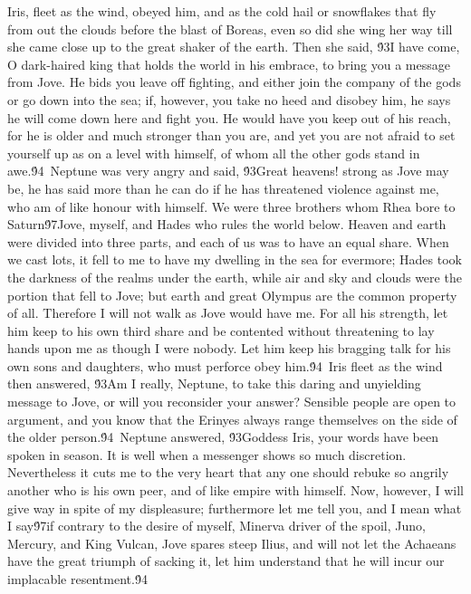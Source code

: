 {Iris, fleet as the wind, obeyed him, and as the cold hail or snowflakes that fly from out the clouds before the blast of Boreas, even so did she wing her way till she came close up to the great shaker of the earth. Then she said, \'93I have come, O dark-haired king that holds the world in his embrace, to bring you a message from Jove. He bids you leave off fighting, and either join the company of the gods or go down into the sea; if, however, you take no heed and disobey him, he says he will come down here and fight you. He would have you keep out of his reach, for he is older and much stronger than you are, and yet you are not afraid to set yourself up as on a level with himself, of whom all the other gods stand in awe.\'94\
Neptune was very angry and said, \'93Great heavens! strong as Jove may be, he has said more than he can do if he has threatened violence against me, who am of like honour with himself. We were three brothers whom Rhea bore to Saturn\'97Jove, myself, and Hades who rules the world below. Heaven and earth were divided into three parts, and each of us was to have an equal share. When we cast lots, it fell to me to have my dwelling in the sea for evermore; Hades took the darkness of the realms under the earth, while air and sky and clouds were the portion that fell to Jove; but earth and great Olympus are the common property of all. Therefore I will not walk as Jove would have me. For all his strength, let him keep to his own third share and be contented without threatening to lay hands upon me as though I were nobody. Let him keep his bragging talk for his own sons and daughters, who must perforce obey him.\'94\
Iris fleet as the wind then answered, \'93Am I really, Neptune, to take this daring and unyielding message to Jove, or will you reconsider your answer? Sensible people are open to argument, and you know that the Erinyes always range themselves on the side of the older person.\'94\
Neptune answered, \'93Goddess Iris, your words have been spoken in season. It is well when a messenger shows so much discretion. Nevertheless it cuts me to the very heart that any one should rebuke so angrily another who is his own peer, and of like empire with himself. Now, however, I will give way in spite of my displeasure; furthermore let me tell you, and I mean what I say\'97if contrary to the desire of myself, Minerva driver of the spoil, Juno, Mercury, and King Vulcan, Jove spares steep Ilius, and will not let the Achaeans have the great triumph of sacking it, let him understand that he will incur our implacable resentment.\'94\
}
